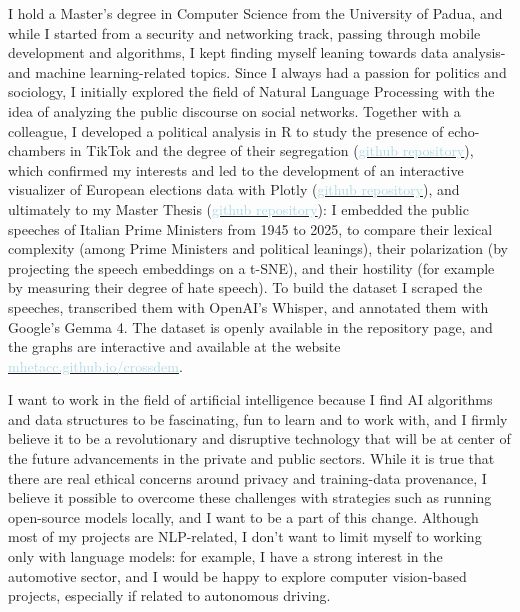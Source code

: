 \documentclass[12pt,a4paper,sans]{moderncv} %
\newcommand{\bluelink}[2]{\href{#1}{\textcolor{lightblue}{#2}}}
\begin{document}
I hold a Master's degree in Computer Science from the University of Padua, and while I started from a security and networking track, passing through mobile development and algorithms, I kept finding myself leaning towards data analysis- and machine learning-related topics. Since I always had a passion for politics and sociology, I initially explored the field of Natural Language Processing with the idea of analyzing the public discourse on social networks. Together with a colleague, I developed a political analysis in R to study the presence of echo-chambers in TikTok and the degree of their segregation (\bluelink{https://github.com/mhetacc/TikTok_SocialNetworkAnalysis}{github repository}), which confirmed my interests and led to the development of an interactive visualizer of European elections data with Plotly (\bluelink{https://github.com/mhetacc/HLSK_InteractiveVisualizer}{github repository}), and ultimately to my Master Thesis (\bluelink{https://github.com/mhetacc/crossdem}{github repository}): I embedded the public speeches of Italian Prime Ministers from 1945 to 2025, to compare their lexical complexity (among Prime Ministers and political leanings), their polarization (by projecting the speech embeddings on a t-SNE), and their hostility (for example by measuring their degree of hate speech). To build the dataset I scraped the speeches, transcribed them with OpenAI's Whisper, and annotated them with Google's Gemma 4. The dataset is openly available in the repository page, and the graphs are interactive and available at the website \bluelink{https://mhetacc.github.io/crossdem/}{mhetacc.github.io/crossdem}.

\vspace{2mm}

I want to work in the field of artificial intelligence because I find AI algorithms and data structures to be fascinating, fun to learn and to work with, and I firmly believe it to be a revolutionary and disruptive technology that will be at center of the future advancements in the private and public sectors. While it is true that there are real ethical concerns around privacy and training-data provenance, I believe it possible to overcome these challenges with strategies such as running open-source models locally, and I want to be a part of this change. Although most of my projects are NLP-related, I don't want to limit myself to working only with language models: for example, I have a strong interest in the automotive sector, and I would be happy to explore computer vision-based projects, especially if related to autonomous driving.
 
\end{document}
